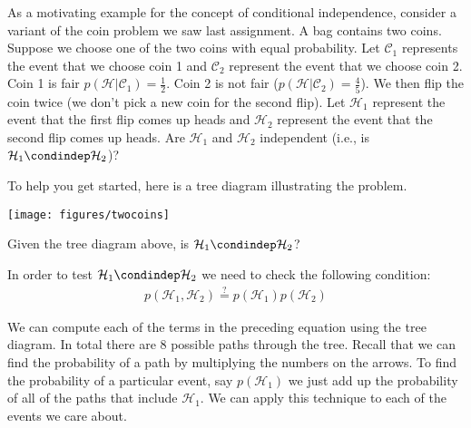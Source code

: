 \documentclass[assignment02_Solutions]{subfiles}
\begin{document}
\begin{exercise}[(20 minutes)]

As a motivating example for the concept of conditional independence, consider a variant of the coin problem we saw last assignment.  A bag contains two coins.  Suppose we choose one of the two coins with equal probability.  Let $\mathcal{C}_1$ represents the event that we choose coin 1 and $\mathcal{C}_2$ represent the event that we choose coin 2.  Coin 1 is fair $p(\mathcal{H} | \mathcal{C}_1) = \frac{1}{2}$.  Coin 2 is not fair ($p(\mathcal{H} | \mathcal{C}_2) = \frac{4}{5}$).   We then flip the coin twice (we don't pick a new coin for the second flip).  Let $\mathcal{H}_1$ represent the event that the first flip comes up heads and $\mathcal{H}_2$ represent the event that the second flip comes up heads.  Are $\mathcal{H}_1$ and $\mathcal{H}_2$ independent (i.e., is $\mathcal{H}_1 \condindep \mathcal{H}_2$)?

To help you get started, here is a tree diagram illustrating the problem.

\begin{center}
\texttt{[image: figures/twocoins]}
\end{center}
Given the tree diagram above, is $\mathcal{H}_1 \condindep \mathcal{H}_2$?

\begin{boxedsolution}

In order to test $\mathcal{H}_1 \condindep \mathcal{H}_2$ we need to check the following condition:
\begin{align}
p(\mathcal{H}_1, \mathcal{H}_2) \stackrel{?}{=} p(\mathcal{H}_1) p(\mathcal{H}_2)
\end{align}

We can compute each of the terms in the preceding equation using the tree diagram.  In total there are 8 possible paths through the tree.  Recall that we can find the probability of a path by multiplying the numbers on the arrows.  To find the probability of a particular event, say $p(\mathcal{H}_1)$ we just add up the probability of all of the paths that include $\mathcal{H}_1$.  We can apply this technique to each of the events we care about.


\end{boxedsolution}
\end{exercise}
\end{document}
